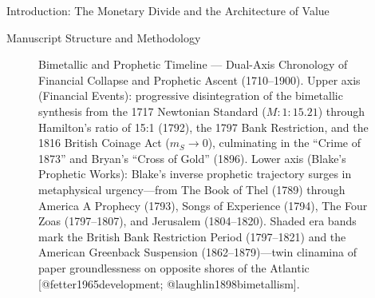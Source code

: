 \documentclass[
  ignorenonframetext,
]{beamer}
\makeatletter
\newcommand*\pandocbounded[1]{%
  \sbox\pandoc@box{#1}%
  \Gscale@div\@tempa{\textheight}{\dimexpr\ht\pandoc@box+\dp\pandoc@box\relax}%
  \Gscale@div\@tempb{\linewidth}{\wd\pandoc@box}%
  \ifdim\@tempb\p@<\@tempa\p@\let\@tempa\@tempb\fi%
  \ifdim\@tempa\p@<\p@\scalebox{\@tempa}{\usebox\pandoc@box}%
  \else\usebox{\pandoc@box}%
  \fi%
}
\makeatother
\begin{document}
\begin{frame}{Introduction: The Monetary Divide and the Architecture of
Value}
\begin{block}{Manuscript Structure and Methodology}
\begin{figure}
\centering
\pandocbounded{\includegraphics[keepaspectratio,alt={Bimetallic and Prophetic Timeline --- Dual-Axis Chronology of Financial Collapse and Prophetic Ascent (1710--1900). Upper axis (Financial Events): progressive disintegration of the bimetallic synthesis from the 1717 Newtonian Standard (M: 1:15.21) through Hamilton's ratio of 15:1 (1792), the 1797 Bank Restriction, and the 1816 British Coinage Act (m\_S \textbackslash to 0), culminating in the ``Crime of 1873'' and Bryan's ``Cross of Gold'' (1896). Lower axis (Blake's Prophetic Works): Blake's inverse prophetic trajectory surges in metaphysical urgency---from The Book of Thel (1789) through America A Prophecy (1793), Songs of Experience (1794), The Four Zoas (1797--1807), and Jerusalem (1804--1820). Shaded era bands mark the British Bank Restriction Period (1797--1821) and the American Greenback Suspension (1862--1879)---twin clinamina of paper groundlessness on opposite shores of the Atlantic {[}@fetter1965development; @laughlin1898bimetallism{]}.}]{../output/figures/timeline.png}}
\caption{Bimetallic and Prophetic Timeline --- Dual-Axis Chronology of
Financial Collapse and Prophetic Ascent (1710--1900). Upper axis
(Financial Events): progressive disintegration of the bimetallic
synthesis from the 1717 Newtonian Standard (\(M: 1:15.21\)) through
Hamilton's ratio of 15:1 (1792), the 1797 Bank Restriction, and the 1816
British Coinage Act (\(m_S \to 0\)), culminating in the ``Crime of
1873'' and Bryan's ``Cross of Gold'' (1896). Lower axis (Blake's
Prophetic Works): Blake's inverse prophetic trajectory surges in
metaphysical urgency---from The Book of Thel (1789) through America A
Prophecy (1793), Songs of Experience (1794), The Four Zoas (1797--1807),
and Jerusalem (1804--1820). Shaded era bands mark the British Bank
Restriction Period (1797--1821) and the American Greenback Suspension
(1862--1879)---twin clinamina of paper groundlessness on opposite shores
of the Atlantic {[}@fetter1965development;
@laughlin1898bimetallism{]}.}\label{fig-timeline}
\end{figure}
\end{block}
\end{frame}
\end{document}
